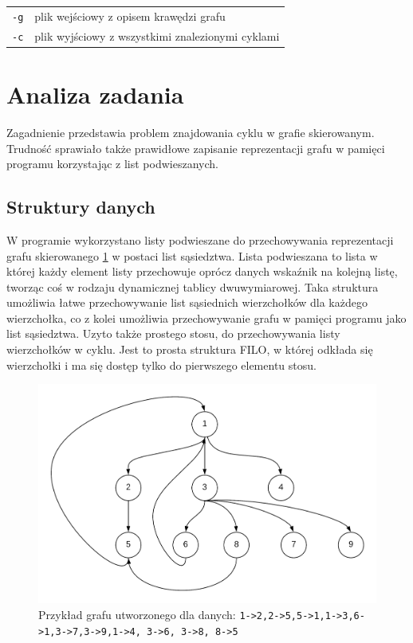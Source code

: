 \documentclass[12pt,a4paper]{article}
\begin{document}
\begin{tabular}{ll}
\texttt{-g}  & plik wejściowy z opisem krawędzi grafu\\
\texttt{-c}  & plik wyjściowy z wszystkimi znalezionymi cyklami\\
\end{tabular}

\section{Analiza zadania}
Zagadnienie przedstawia problem znajdowania cyklu w grafie skierowanym. Trudność sprawiało także prawidłowe zapisanie reprezentacji grafu w pamięci programu korzystając z list podwieszanych.
\subsection{Struktury danych}
W programie wykorzystano listy podwieszane do przechowywania reprezentacji grafu skierowanego \ref{fig:graf} w postaci list sąsiedztwa.
Lista podwieszana to lista w której każdy element listy przechowuje oprócz danych wskaźnik na kolejną listę, tworząc coś w rodzaju dynamicznej tablicy dwuwymiarowej.
Taka struktura umożliwia łatwe przechowywanie list sąsiednich wierzchołków dla każdego wierzchołka, co z kolei umożliwia przechowywanie grafu w pamięci programu jako list sąsiedztwa.
Uzyto także prostego stosu, do przechowywania listy wierzchołków w cyklu. Jest to prosta struktura FILO, w której odkłada się wierzchołki i ma się dostęp tylko do pierwszego elementu stosu.
\begin{figure}[h!]
\centering
\includegraphics[scale=0.15]{graph_PPK.png}
\caption{Przykład grafu utworzonego dla danych: \newline \texttt{1->2,2->5,5->1,1->3,6->1,3->7,3->9,1->4, 3->6, 3->8, 8->5}}
\label{fig:graf}
\end{figure} 
\end{document}

